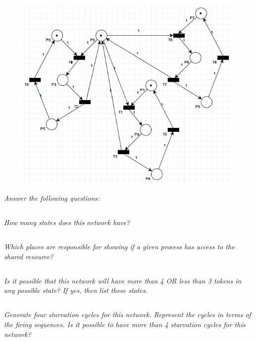 \documentclass[letterpaper]{article}
\begin{document}
\begin{figure}[H]
 \centering
 \includegraphics[width=\textwidth]{image4.png}
\end{figure}

\textit{Answer the following questions:}

\subsection{}
\textit{How many states does this network have?
}

\subsection{}
\textit{Which places are responsible for showing if a given process has access to the shared resource?}

\subsection{}
\textit{Is it possible that this network will have more than 4 OR less than 3 tokens in any possible state?
 If yes, then list these states.
}

\subsection{}
\textit{Generate four starvation cycles for this network. Represent the cycles in terms of the firing sequences. Is it possible to have more than 4 starvation cycles for this network?}
\end{document}
